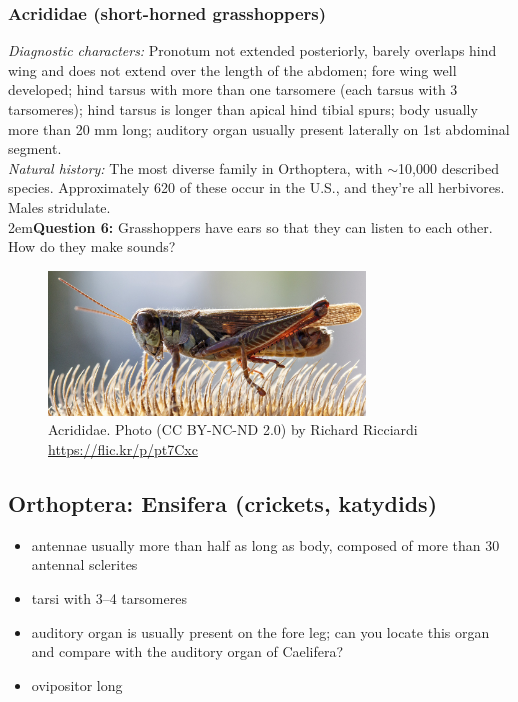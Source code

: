 \documentclass[letterpaper, 11pt]{article}
\begin{document}
\subsubsection{Acrididae (short-horned grasshoppers)}
\noindent{}\textit{Diagnostic characters:} Pronotum not extended posteriorly, barely overlaps hind wing and does not extend over the length of the abdomen; fore wing well developed; hind tarsus with more than one tarsomere (each tarsus with 3 tarsomeres); hind tarsus is longer than apical hind tibial spurs; body usually more than 20 mm long; auditory organ usually present laterally on 1st abdominal segment.\\

\noindent{}\textit{Natural history:} The most diverse family in Orthoptera, with $\sim$10,000 described species. Approximately 620 of these occur in the U.S., and they're all herbivores. Males stridulate.\\

\hangindent2em\textbf{Question 6:} Grasshoppers have ears so that they can listen to each other. How do they make sounds?\\

\begin{figure}[ht!]
  \centering
    \includegraphics[width=0.75\textwidth]{acrid}
  \caption{Acrididae. Photo (CC BY-NC-ND 2.0) by Richard Ricciardi \url{https://flic.kr/p/pt7Cxc}}
  \label{fig:acrididhabitus}
\end{figure}

\subsection{Orthoptera: Ensifera (crickets, katydids)}
\begin{itemize}
\item antennae usually more than half as long as body, composed of more than 30 antennal sclerites
\item tarsi with 3--4 tarsomeres
\item auditory organ is usually present on the fore leg; can you locate this organ and compare with the auditory organ of Caelifera?
\item ovipositor long
\end{itemize}
\end{document}
